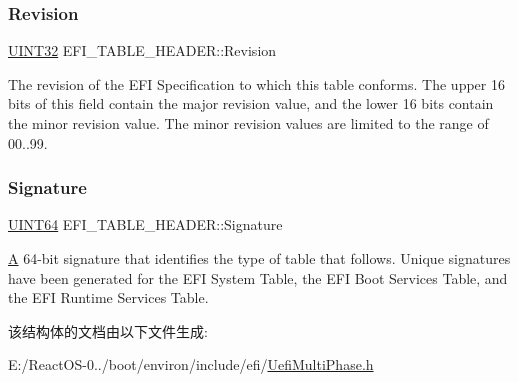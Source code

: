 \subsubsection{\texorpdfstring{Revision}{Revision}}
{\footnotesize\ttfamily \hyperlink{_processor_bind_8h_ae1e6edbbc26d6fbc71a90190d0266018}{U\+I\+N\+T32} E\+F\+I\+\_\+\+T\+A\+B\+L\+E\+\_\+\+H\+E\+A\+D\+E\+R\+::\+Revision}

The revision of the E\+FI Specification to which this table conforms. The upper 16 bits of this field contain the major revision value, and the lower 16 bits contain the minor revision value. The minor revision values are limited to the range of 00..99. \mbox{\label{struct_e_f_i___t_a_b_l_e___h_e_a_d_e_r_ac64d8f731c5e181fea6e1f6d151f8eab}} 
\subsubsection{\texorpdfstring{Signature}{Signature}}
{\footnotesize\ttfamily \hyperlink{_processor_bind_8h_a57be03562867144161c1bfee95ca8f7c}{U\+I\+N\+T64} E\+F\+I\+\_\+\+T\+A\+B\+L\+E\+\_\+\+H\+E\+A\+D\+E\+R\+::\+Signature}

\hyperlink{struct_a}{A} 64-\/bit signature that identifies the type of table that follows. Unique signatures have been generated for the E\+FI System Table, the E\+FI Boot Services Table, and the E\+FI Runtime Services Table. 

该结构体的文档由以下文件生成\+:\begin{DoxyCompactItemize}
\item 
E\+:/\+React\+O\+S-\/0../boot/environ/include/efi/\hyperlink{_uefi_multi_phase_8h}{Uefi\+Multi\+Phase.\+h}\end{DoxyCompactItemize}
